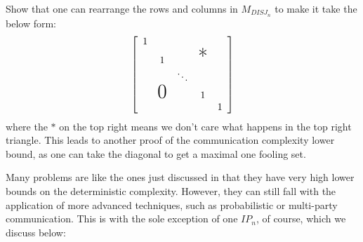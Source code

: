 \documentclass[letterpaper]{article}
\begin{document}
\begin{problem}
Show that one can rearrange the rows and columns in $M_{DISJ_n}$ to
make it take the below form:
\[
    \left[
        \begin{array}{ccccc}
            1                                             \\
             & 1             &        & \text{\huge*}     \\
             &               & \ddots                     \\
             & \text{\huge0} &        & 1                 \\
             &               &        &               & 1
        \end{array}
        \right]
\]
where the $*$ on the top right means we don't care what happens in the top right triangle.
This leads to another proof of the communication complexity lower bound,
as one can take the diagonal to get a maximal one fooling set.
\end{problem}

Many problems are like the ones just discussed in that they have
very high lower bounds on the deterministic complexity.
However, they can still fall with the application of more advanced techniques,
such as probabilistic or multi-party communication.
This is with the sole exception of one $IP_n$, of course, which we discuss below:
\end{document}
